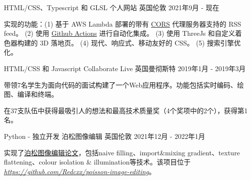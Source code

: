 
\begin{cventries}

\cventry
{HTML/CSS、Typescript 和 GLSL} %
{个人网站} %
{英国伦敦} %
{2021年9月 - 现在} %
{
\begin{cvitems} %
\item {实现的功能：(1) 基于 AWS Lambda 部署的带有 \href{https://developer.mozilla.org/en-US/docs/Web/HTTP/CORS}{CORS} 代理服务器支持的 RSS feed。 (2) 使用 \href{https://github.com/features/actions}{Github Actions} 进行自动化集成。 (3) 使用 ThreeJs 和自定义着色器构建的 3D 落地页。 (4) 现代、响应式、移动友好的 CSS。 (5) 搜索引擎优化。}
\end{cvitems}
}

\cventry
{HTML/CSS 和 Javascript} %
{Collaborate Live} %
{英国曼彻斯特} %
{2019年1月 - 2019年3月} %
{
  \begin{cvitems} %
    \item {带领7名学生为面向代码的面试构建了一个Web应用程序。功能包括实时编码、绘图、编译和终端。}
    \item {在37支队伍中获得最吸引人的想法和最高技术质量奖（4个奖项中的2个），获得第1名。}
  \end{cvitems}
}
\cventry
{Python - 独立开发} %
{泊松图像编辑} %
{英国伦敦} %
{2021年12月 - 2022年1月} %
{
\begin{cvitems} %
\item {实现了\href{https://www.cs.jhu.edu/~misha/Fall07/Papers/Perez03.pdf}{泊松图像编辑论文}，包括naive filling、import\&mixing gradient、texture flattening、colour isolation \& illumination等技术。该项目位于\href{https://github.com/Redcxx/poisson-image-editing}{\textit{https://github.com/Redcxx/poisson-image-editing}}。}
\end{cvitems}
}

\end{cventries}
